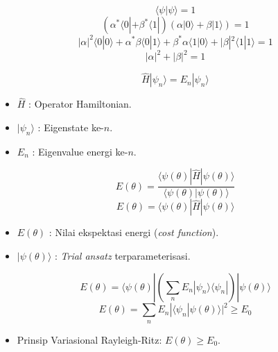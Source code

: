 \begin{equation}
    \langle \psi | \psi \rangle = 1
\end{equation}
\begin{equation}
    (\alpha^* \langle 0 | + \beta^* \langle 1 |) (\alpha |0\rangle + \beta |1\rangle) = 1
\end{equation}
\begin{equation}
    |\alpha|^2 \langle 0|0\rangle + \alpha^* \beta \langle 0|1\rangle + \beta^* \alpha \langle 1|0\rangle + |\beta|^2 \langle 1|1\rangle = 1
\end{equation}
\begin{equation}
    |\alpha|^2 + |\beta|^2 = 1
\end{equation}

\begin{equation}
    \hat{H} |\psi_n\rangle = E_n |\psi_n\rangle
\end{equation}
\begin{itemize}
    \item $\hat{H}$ : Operator Hamiltonian.
    \item $|\psi_n\rangle$ : Eigenstate ke-$n$.
    \item $E_n$ : Eigenvalue energi ke-$n$.
\end{itemize}

\begin{equation}
    E(\theta) = \frac{\langle \psi(\theta) | \hat{H} | \psi(\theta) \rangle}{\langle \psi(\theta) | \psi(\theta) \rangle}
\end{equation}
\begin{equation}
    E(\theta) = \langle \psi(\theta) | \hat{H} | \psi(\theta) \rangle
\end{equation}
\begin{itemize}
    \item $E(\theta)$ : Nilai ekspektasi energi (\textit{cost function}).
    \item $|\psi(\theta)\rangle$ : \textit{Trial ansatz} terparameterisasi.
\end{itemize}

\begin{equation}
    E(\theta) = \langle \psi(\theta) | \left( \sum_n E_n | \psi_n \rangle \langle \psi_n | \right) | \psi(\theta) \rangle
\end{equation}
\begin{equation}
    E(\theta) = \sum_n E_n |\langle \psi_n | \psi(\theta) \rangle|^2 \geq E_0
\end{equation}
\begin{itemize}
    \item Prinsip Variasional Rayleigh-Ritz: $E(\theta) \geq E_0$.
\end{itemize}

